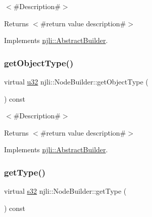 $<$\#\+Description\#$>$

\begin{DoxyReturn}{Returns}
$<$\#return value description\#$>$ 
\end{DoxyReturn}


Implements \mbox{\hyperlink{classnjli_1_1_abstract_builder_a902f73ea78031b06aca183a417f3413b}{njli\+::\+Abstract\+Builder}}.

\mbox{\label{classnjli_1_1_node_builder_a8f64ec36093df1da2c75187f5ec40460}} 
\subsubsection{\texorpdfstring{get\+Object\+Type()}{getObjectType()}}
{\footnotesize\ttfamily virtual \mbox{\hyperlink{_util_8h_a10e94b422ef0c20dcdec20d31a1f5049}{u32}} njli\+::\+Node\+Builder\+::get\+Object\+Type (\begin{DoxyParamCaption}{ }\end{DoxyParamCaption}) const\hspace{0.3cm}{\ttfamily [virtual]}}

$<$\#\+Description\#$>$

\begin{DoxyReturn}{Returns}
$<$\#return value description\#$>$ 
\end{DoxyReturn}


Implements \mbox{\hyperlink{classnjli_1_1_abstract_builder_a0f2d344fcf697b167f4f2b1122b5fb33}{njli\+::\+Abstract\+Builder}}.

\mbox{\label{classnjli_1_1_node_builder_a13d5f0892f290de9ad73ac608c484a8d}} 
\subsubsection{\texorpdfstring{get\+Type()}{getType()}}
{\footnotesize\ttfamily virtual \mbox{\hyperlink{_util_8h_aa62c75d314a0d1f37f79c4b73b2292e2}{s32}} njli\+::\+Node\+Builder\+::get\+Type (\begin{DoxyParamCaption}{ }\end{DoxyParamCaption}) const\hspace{0.3cm}{\ttfamily [virtual]}}

